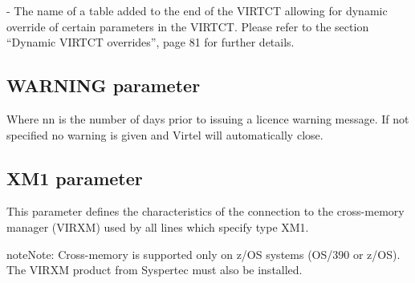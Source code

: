 \documentclass[letterpaper,10pt,english]{sphinxmanual}
\begin{document}
 - The name of a table added to the end of the VIRTCT allowing for dynamic override of certain parameters in the VIRTCT. Please refer to the section “Dynamic VIRTCT overrides”, page 81 for further details.

\ignorespaces 

\subsection{WARNING parameter}
\label{\detokenize{Installation_Guide:warning-parameter}}\label{\detokenize{Installation_Guide:index-140}}
\begin{sphinxVerbatim}[commandchars=\\\{\}]
\end{sphinxVerbatim}

Where nn is the number of days prior to issuing a licence warning message. If not specified no warning is given and Virtel will automatically close.

\ignorespaces 

\subsection{XM1 parameter}
\label{\detokenize{Installation_Guide:xm1-parameter}}\label{\detokenize{Installation_Guide:index-141}}
\begin{sphinxVerbatim}[commandchars=\\\{\}]
   
\PYG{p}{[}\PYG{p}{]}
\end{sphinxVerbatim}

This parameter defines the characteristics of the connection to the cross-memory manager (VIRXM) used by all lines which specify type XM1.

\begin{sphinxadmonition}{note}{Note:}
Cross-memory is supported only on z/OS systems (OS/390 or z/OS). The VIRXM product from Syspertec must also be installed.
\end{sphinxadmonition}
\end{document}
